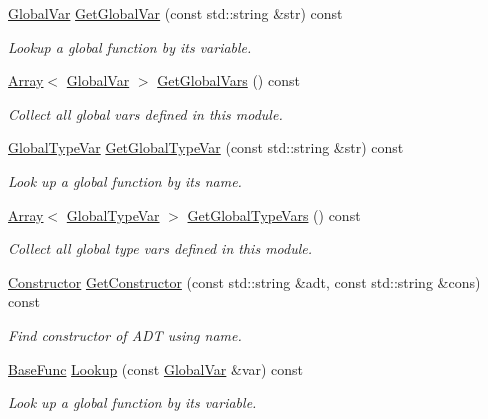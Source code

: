 \begin{DoxyCompactItemize}
\hyperlink{classtvm_1_1GlobalVar}{Global\+Var} \hyperlink{classtvm_1_1IRModuleNode_a1930de860e8f5a6d39da503e88621da9}{Get\+Global\+Var} (const std\+::string \&str) const 
\begin{DoxyCompactList}\small\item\em Lookup a global function by its variable. \end{DoxyCompactList}\item 
\hyperlink{classtvm_1_1Array}{Array}$<$ \hyperlink{classtvm_1_1GlobalVar}{Global\+Var} $>$ \hyperlink{classtvm_1_1IRModuleNode_a45e6e5cf1e544f6230f1b048aa214fa3}{Get\+Global\+Vars} () const 
\begin{DoxyCompactList}\small\item\em Collect all global vars defined in this module. \end{DoxyCompactList}\item 
\hyperlink{classtvm_1_1GlobalTypeVar}{Global\+Type\+Var} \hyperlink{classtvm_1_1IRModuleNode_a61f3008a7e1f4cc4910a6b687180cb06}{Get\+Global\+Type\+Var} (const std\+::string \&str) const 
\begin{DoxyCompactList}\small\item\em Look up a global function by its name. \end{DoxyCompactList}\item 
\hyperlink{classtvm_1_1Array}{Array}$<$ \hyperlink{classtvm_1_1GlobalTypeVar}{Global\+Type\+Var} $>$ \hyperlink{classtvm_1_1IRModuleNode_aedd95d1388c07381eb4fabedeea8b7e5}{Get\+Global\+Type\+Vars} () const 
\begin{DoxyCompactList}\small\item\em Collect all global type vars defined in this module. \end{DoxyCompactList}\item 
\hyperlink{classtvm_1_1Constructor}{Constructor} \hyperlink{classtvm_1_1IRModuleNode_ab9d56f56190fa8c6265ea172ef00eae7}{Get\+Constructor} (const std\+::string \&adt, const std\+::string \&cons) const 
\begin{DoxyCompactList}\small\item\em Find constructor of A\+DT using name. \end{DoxyCompactList}\item 
\hyperlink{classtvm_1_1BaseFunc}{Base\+Func} \hyperlink{classtvm_1_1IRModuleNode_a46e08749832a28023b3452e426fe51f2}{Lookup} (const \hyperlink{classtvm_1_1GlobalVar}{Global\+Var} \&var) const 
\begin{DoxyCompactList}\small\item\em Look up a global function by its variable. \end{DoxyCompactList}\item 

\end{DoxyCompactItemize}
